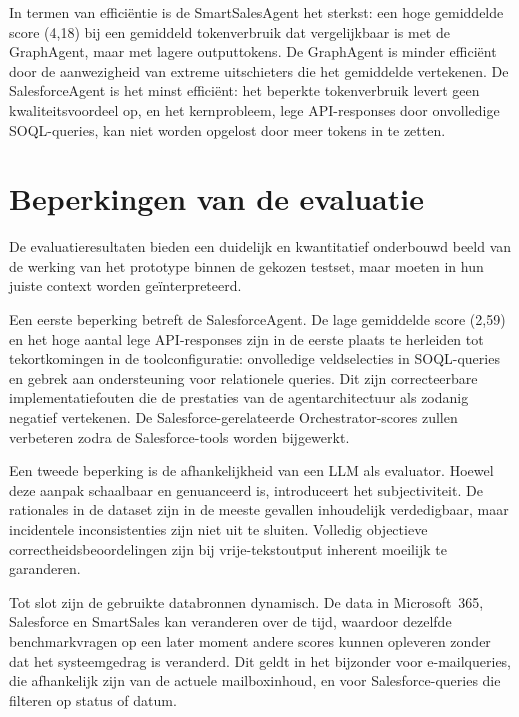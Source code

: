 In termen van efficiëntie is de SmartSalesAgent het sterkst: een hoge gemiddelde score (4,18) bij een gemiddeld tokenverbruik dat vergelijkbaar is met de GraphAgent, maar met lagere outputtokens. De GraphAgent is minder efficiënt door de aanwezigheid van extreme uitschieters die het gemiddelde vertekenen. De SalesforceAgent is het minst efficiënt: het beperkte tokenverbruik levert geen kwaliteitsvoordeel op, en het kernprobleem, lege API-responses door onvolledige SOQL-queries, kan niet worden opgelost door meer tokens in te zetten.

\section{Beperkingen van de evaluatie}
\label{sec:evaluatie-beperkingen}

De evaluatieresultaten bieden een duidelijk en kwantitatief onderbouwd beeld van de werking van het prototype binnen de gekozen testset, maar moeten in hun juiste context worden geïnterpreteerd.

Een eerste beperking betreft de SalesforceAgent. De lage gemiddelde score (2,59) en het hoge aantal lege API-responses zijn in de eerste plaats te herleiden tot tekortkomingen in de toolconfiguratie: onvolledige veldselecties in SOQL-queries en gebrek aan ondersteuning voor relationele queries. Dit zijn correcteerbare implementatiefouten die de prestaties van de agentarchitectuur als zodanig negatief vertekenen. De Salesforce-gerelateerde Orchestrator-scores zullen verbeteren zodra de Salesforce-tools worden bijgewerkt.

Een tweede beperking is de afhankelijkheid van een LLM als evaluator. Hoewel deze aanpak schaalbaar en genuanceerd is, introduceert het subjectiviteit. De rationales in de dataset zijn in de meeste gevallen inhoudelijk verdedigbaar, maar incidentele inconsistenties zijn niet uit te sluiten. Volledig objectieve correctheidsbeoordelingen zijn bij vrije-tekstoutput inherent moeilijk te garanderen.

Tot slot zijn de gebruikte databronnen dynamisch. De data in Microsoft~365, Salesforce en SmartSales kan veranderen over de tijd, waardoor dezelfde benchmarkvragen op een later moment andere scores kunnen opleveren zonder dat het systeemgedrag is veranderd. Dit geldt in het bijzonder voor e-mailqueries, die afhankelijk zijn van de actuele mailboxinhoud, en voor Salesforce-queries die filteren op status of datum.